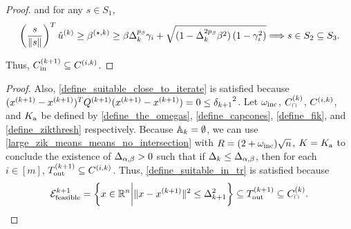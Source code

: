 \begin{proof}
and for any $s\in S_1$,
\begin{align*}
\left(\frac{s}{\|s\|}\right)^T{{\hat u}^{(k)}} \ge {\beta^{(\star, k)}} 
\ge \beta\Delta_k^{p_{\beta}}\gamma_i + \sqrt{(1 - \Delta_k^{2p_{\beta}}\beta^2)\left(1 - \gamma_i^2\right)}
\Longrightarrow s \in S_2 \subseteq S_3.
\end{align*}

Thus, ${C^{(k+1)}_{\textrm{in}}} \subseteq {C^{(i, k)}}$.
\end{proof}




\begin{proof}

Also, \cref{define_suitable_close_to_iterate} is satisfied because $({{x}^{(k+1)}} - {{x}^{(k+1)}})^T{Q^{(k+1)}}({{x}^{(k+1)}} - {{x}^{(k+1)}}) = 0 \le {\delta_{k+1}}^2$.
Let $\omega_{\text{inc}}$, ${C^{(k)}_{\cap}}$, ${C^{(i, k)}}$, and ${ K_{\textrm{a}} }$ be defined by \cref{define_the_omegas}, \cref{define_capcones}, \cref{define_fik}, and \cref{define_zikthresh} respectively.
Because ${\mathbb A_{k}} = \emptyset$, we can use 
\cref{large_zik_means_means_no_intersection} with $R = (2 + \omega_{\text{inc}})\sqrt{n}$, $K = { K_{\textrm{a}} }$ to conclude the existence of ${\Delta_{\alpha,\beta}} > 0$ such that 
if $\Delta_k \le {\Delta_{\alpha,\beta}}$, then for each 
$i \in [m]$, ${T_{\text{out}}^{(k+1)}} \subseteq {C^{(i, k)}}$.
Thus, \cref{define_suitable_in_tr} is satisfied because 
\begin{align*}
{\mathcal E^{k+1}_{\textrm{feasible}}} = \left\{x \in \mathbb R^n \bigg| \|x - {{x}^{(k+1)}}\|^2 \le \Delta_{k+1}^2 \right\} \subseteq {T_{\text{out}}^{(k+1)}} \subseteq {C^{(k)}_{\cap}}.
\end{align*}
\end{proof}


